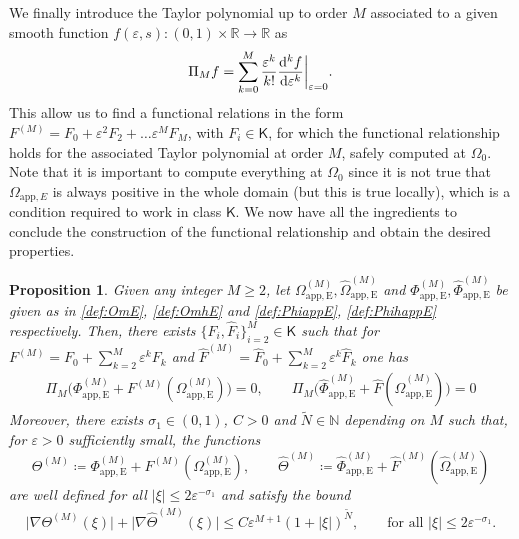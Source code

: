 \documentclass[11pt,reqno,a4paper]{amsart}
\def\dd{{\rm d}}
\def\eps{\varepsilon}
\def\RR {\mathbb{R}}
\def\NN {\mathbb{N}}
\newcommand{\app}{\mathrm{app}}
\newcommand{\1}{\mathbbm{1}}
\newtheorem{proposition}{Proposition}[section]
\theoremstyle{definition}
\theoremstyle{definition}
\numberwithin{equation}{section}
\newcommand{\Mappp}[3]{#1^{(#2)}_\mathrm{app,#3}}
\begin{document}
We finally introduce the Taylor polynomial up to order $M$ associated to a given smooth function $f(\eps,s):(0,1)\times \RR\to \RR$ as 
\begin{equation}
    \Pi_M f=\sum_{k=0}^M\frac{\eps^k}{k!}\frac{\dd^k f}{\dd \eps^k}\bigg|_{\eps=0}.
\end{equation}
This allow us to find a functional relations in the form $F^{(M)}=F_0+\eps^2F_2+\dots \eps^MF_M$, with $F_i\in \mathsf{K}$, for which the functional relationship holds for the associated Taylor polynomial at order $M$, safely computed at $\Omega_0$. Note that it is important to compute everything at $\Omega_0$ since it is not true that $\Omega_{\app,E}$ is always positive in the whole domain (but this is true locally), which is a condition required to work in class $\mathsf{K}$. We now have all the ingredients to conclude the construction of the functional relationship and obtain the desired properties.
\begin{proposition}
\label{prop:functional}
    Given any integer $M\geq2$, let $\Mappp{\Omega}{M}{E},\Mappp{\widehat{\Omega}}{M}{E} $ and $\Mappp{\Phi}{M}{E},\Mappp{\widehat \Phi}{M}{E}$ be given as in \cref{def:OmE}, \cref{def:OmhE} and \cref{def:PhiappE}, \cref{def:PhihappE} respectively. Then, there exists $\{F_i,\widehat{F}_i\}_{i=2}^M\in \mathsf{K}$ such that for $F^{(M)}=F_0+\sum_{k=2}^M\eps^kF_k$ and $\widehat{F}^{(M)}=\widehat{F}_0+\sum_{k=2}^M\eps^k\widehat{F}_k$ one has 
    \begin{align}
\Pi_{M}\big(\Mappp{\Phi}{M}{E}+F^{(M)}(\Mappp{\Omega}{M}{E})\big)=0, \qquad \Pi_{M}\big(\Mappp{\widehat \Phi}{M}{E}+\widehat{F}(\Mappp{\widehat \Omega}{M}{E})\big)=0
    \end{align}
    Moreover, there exists $\sigma_1\in (0,1)$, $C>0$ and $\widetilde{N}\in \NN$ depending on $M$ such that, for $\eps>0$ sufficiently small, the functions 
    \begin{equation}
        \Theta^{(M)}\coloneqq \Mappp{\Phi}{M}{E}+F^{(M)}(\Mappp{\Omega}{M}{E}), \qquad\widehat{\Theta}^{(M)}\coloneqq \Mappp{\widehat\Phi}{M}{E}+{\widehat F}^{(M)}(\Mappp{\widehat \Omega}{M}{E})
    \end{equation}
    are well defined for all $|\xi|\leq 2\eps^{-\sigma_1}$ and satisfy the bound
    \begin{align}
    \label{bd:keyapp}
        \big|\nabla \Theta^{(M)}(\xi)\big|+ \big|\nabla \widehat{\Theta}^{(M)}(\xi)\big|\leq C\eps^{M+1}(1+|\xi|)^{\widetilde{N}}, \qquad \text{for all }|\xi|\leq 2\eps^{-\sigma_1}.
    \end{align}
\end{proposition}
\end{document}
